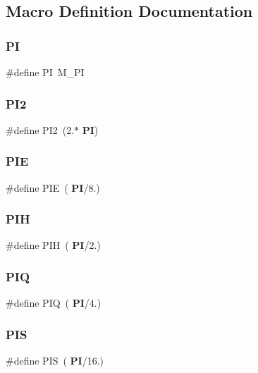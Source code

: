 \subsection{Macro Definition Documentation}
\mbox{\label{mat_lib_8h_a598a3330b3c21701223ee0ca14316eca}} 
\subsubsection{PI}
{\footnotesize\ttfamily \#define PI~M\+\_\+\+PI}

\mbox{\label{mat_lib_8h_a2750dfdda752269a036f487a4a34b849}} 
\subsubsection{P\+I2}
{\footnotesize\ttfamily \#define P\+I2~(2.$\ast$\textbf{ PI})}

\mbox{\label{mat_lib_8h_ac40c2b49eb51e2adc237b530adfcadf4}} 
\subsubsection{P\+IE}
{\footnotesize\ttfamily \#define P\+IE~(\textbf{ PI}/8.)}

\mbox{\label{mat_lib_8h_ad2bc664cd3f13c220486ba66209a751f}} 
\subsubsection{P\+IH}
{\footnotesize\ttfamily \#define P\+IH~(\textbf{ PI}/2.)}

\mbox{\label{mat_lib_8h_a21226a150b101118c7b03975627e6f8c}} 
\subsubsection{P\+IQ}
{\footnotesize\ttfamily \#define P\+IQ~(\textbf{ PI}/4.)}

\mbox{\label{mat_lib_8h_a428ec179178904a7b6699f2a3f8eedf6}} 
\subsubsection{P\+IS}
{\footnotesize\ttfamily \#define P\+IS~(\textbf{ PI}/16.)}



